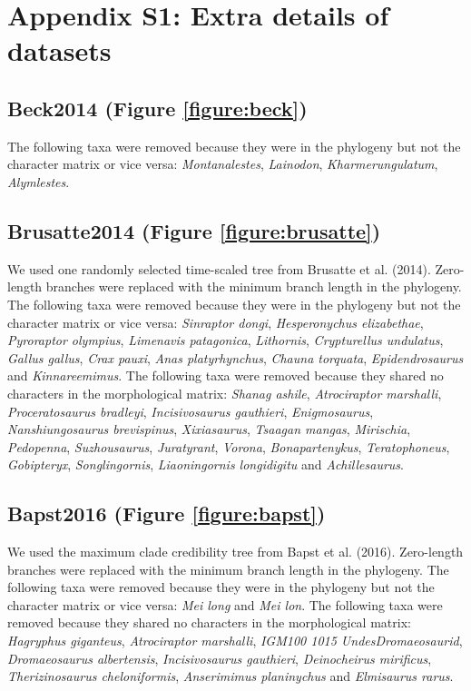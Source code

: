 \documentclass[12pt,a4paper]{article}
\begin{document}

\raggedright
\setlength{\parindent}{1cm}

\section{Appendix S1: Extra details of datasets}

\subsection{Beck2014 (Figure \ref{figure:beck})}
The following taxa were removed because they were in the phylogeny but not the character matrix or vice versa: \textit{Montanalestes}, \textit{Lainodon}, \textit{Kharmerungulatum}, \textit{Alymlestes}. 

\subsection{Brusatte2014 (Figure \ref{figure:brusatte})} 
We used one randomly selected time-scaled tree from Brusatte et al. (2014).
Zero-length branches were replaced with the minimum branch length in the phylogeny.
The following taxa were removed because they were in the phylogeny but not the character matrix or vice versa: \textit{Sinraptor dongi}, \textit{Hesperonychus elizabethae}, \textit{Pyroraptor olympius}, \textit{Limenavis patagonica}, \textit{Lithornis}, \textit{Crypturellus undulatus}, \textit{Gallus gallus}, \textit{Crax pauxi}, \textit{Anas platyrhynchus}, \textit{Chauna torquata}, \textit{Epidendrosaurus} and \textit{Kinnareemimus}. 
The following taxa were removed because they shared no characters in the morphological matrix: \textit{Shanag ashile}, \textit{Atrociraptor marshalli}, \textit{Proceratosaurus bradleyi}, \textit{Incisivosaurus gauthieri}, \textit{Enigmosaurus}, \textit{Nanshiungosaurus brevispinus}, \textit{Xixiasaurus}, \textit{Tsaagan mangas}, \textit{Mirischia}, \textit{Pedopenna}, \textit{Suzhousaurus}, \textit{Juratyrant}, \textit{Vorona}, \textit{Bonapartenykus}, \textit{Teratophoneus}, \textit{Gobipteryx}, \textit{Songlingornis}, \textit{Liaoningornis longidigitu} and \textit{Achillesaurus}.   

\subsection{Bapst2016 (Figure \ref{figure:bapst})} 
We used the maximum clade credibility tree from Bapst et al. (2016).
Zero-length branches were replaced with the minimum branch length in the phylogeny.
The following taxa were removed because they were in the phylogeny but not the character matrix or vice versa: \textit{Mei long} and \textit{Mei lon}. 
The following taxa were removed because they shared no characters in the morphological matrix: \textit{Hagryphus giganteus}, \textit{Atrociraptor marshalli}, \textit{IGM100 1015 UndesDromaeosaurid}, \textit{Dromaeosaurus albertensis}, \textit{Incisivosaurus gauthieri}, \textit{Deinocheirus mirificus}, \textit{Therizinosaurus cheloniformis},  \textit{Anserimimus planinychus} and \textit{Elmisaurus rarus}. 
\end{document}
